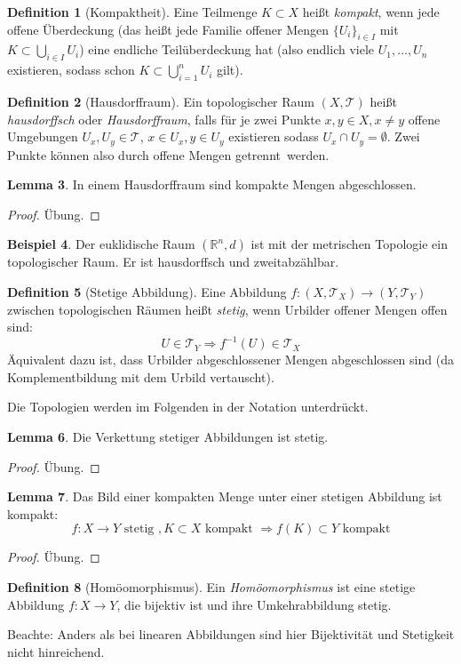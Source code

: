 \documentclass[a4paper]{scrbook}
\numberwithin{equation}{chapter}
\newcommand{\R}{\mathbb{R}}
\theoremstyle{definition}
\newtheorem{defn}{Definition}[section]
\newtheorem{lemma}[defn]{Lemma}
\newtheorem{bsp}[defn]{Beispiel}
\newcommand{\bewUeb}{\begin{proof}Übung.\end{proof}}
\begin{document}
		\begin{defn}[Kompaktheit]
			Eine Teilmenge $K\subset X$ heißt \emph{kompakt}, wenn jede offene Überdeckung (das heißt jede Familie offener Mengen $\lbrace U_i\rbrace_{i\in I}$ mit $K\subset \bigcup_{i\in I}U_i$) eine endliche Teilüberdeckung hat (also endlich viele $U_1,\ldots,U_n$ existieren, sodass schon $K\subset \bigcup_{i=1}^n U_i$ gilt).
		\end{defn}
		\begin{defn}[Hausdorffraum]
			Ein topologischer Raum $(X,\mathcal{T})$ heißt \emph{hausdorffsch} oder \emph{Hausdorffraum}, falls für je zwei Punkte $x,y\in X, x\neq y$ offene Umgebungen ${U_x,U_y\in\mathcal{T}}$, ${x\in U_x}, {y\in U_y}$ existieren sodass $U_x\cap U_y=\emptyset$. Zwei Punkte können also durch offene Mengen \glqq getrennt\grqq\ werden.
		\end{defn}
		\begin{lemma}
			In einem Hausdorffraum sind kompakte Mengen abgeschlossen.
			\bewUeb
		\end{lemma}
		\begin{bsp}
			Der euklidische Raum $(\R^n,d)$ ist mit der metrischen Topologie ein topologischer Raum. Er ist hausdorffsch und zweitabzählbar.
		\end{bsp}
		\begin{defn}[Stetige Abbildung]
			Eine Abbildung $f\colon (X,\mathcal{T}_X)\rightarrow (Y,\mathcal{T}_Y)$ zwischen topologischen Räumen heißt \emph{stetig}, wenn Urbilder offener Mengen offen sind:
			\begin{equation*}
				U\in\mathcal{T}_Y \Rightarrow f^{-1}(U)\in\mathcal{T}_X
			\end{equation*}
			Äquivalent dazu ist, dass Urbilder abgeschlossener Mengen abgeschlossen sind (da Komplementbildung mit dem Urbild vertauscht).
		\end{defn}
		Die Topologien werden im Folgenden in der Notation unterdrückt.
		\begin{lemma}
			Die Verkettung stetiger Abbildungen ist stetig.
			\bewUeb
		\end{lemma}
		\begin{lemma}
			Das Bild einer kompakten Menge unter einer stetigen Abbildung ist kompakt:
			\begin{equation*}
				f\colon X\rightarrow Y \text{ stetig }, K\subset X \text{ kompakt }\Rightarrow f(K)\subset Y \text{ kompakt}
			\end{equation*}
			\bewUeb
		\end{lemma}
		\begin{defn}[Homöomorphismus]
			Ein \emph{Homöomorphismus} ist eine stetige Abbildung $f\colon X\rightarrow Y$, die bijektiv ist und ihre Umkehrabbildung stetig.
			
			Beachte: Anders als bei linearen Abbildungen sind hier Bijektivität und Stetigkeit nicht hinreichend.
		\end{defn}
\end{document}
